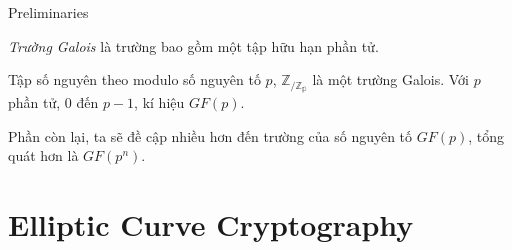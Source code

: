 \documentclass [xcolor=svgnames, t] {beamer}
\theoremstyle{definition}
\begin{document}
\begin{frame}{Preliminaries}
    \begin{definition}
        \textit{Trường Galois} là trường bao gồm một tập hữu hạn phần tử.
    \end{definition}
    \begin{example}
        Tập số nguyên theo modulo số nguyên tố $p$, $\mathbb{Z}_{/\mathbb{Z_p}}$ là một trường Galois. Với $p$ phần tử, $0$ đến $p-1$,
        kí hiệu $GF(p)$.
    \end{example}
    Phần còn lại, ta sẽ đề cập nhiều hơn đến trường của số nguyên tố $GF(p)$, tổng quát hơn là $GF(p^n)$.
\end{frame}
\section{Elliptic Curve Cryptography}
\end{document}

